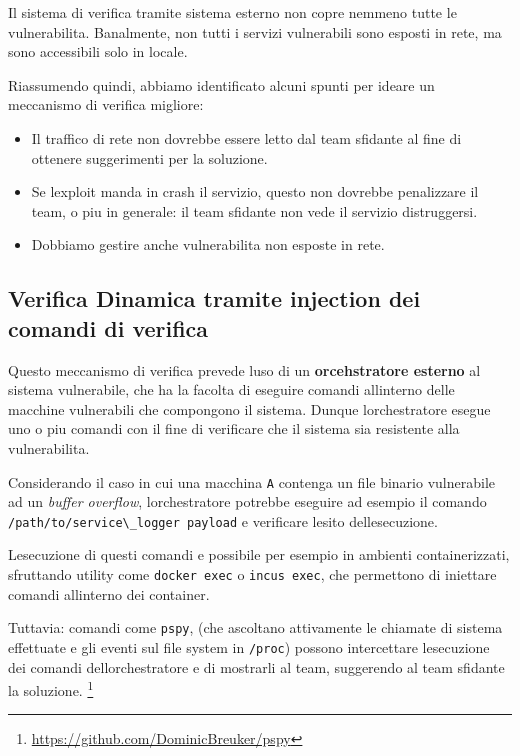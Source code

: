 Il sistema di verifica tramite sistema esterno non copre nemmeno tutte
le vulnerabilita. Banalmente, non tutti i servizi vulnerabili sono
esposti in rete, ma sono accessibili solo in locale.

Riassumendo quindi, abbiamo identificato alcuni spunti per ideare un
meccanismo di verifica migliore:

\begin{itemize}
\tightlist
\item
  Il traffico di rete non dovrebbe essere letto dal team sfidante al
  fine di ottenere suggerimenti per la soluzione.
\item
  Se l\textquotesingle exploit manda in crash il servizio, questo non
  dovrebbe penalizzare il team, o piu in generale: il team sfidante non
  vede il servizio distruggersi.
\item
  Dobbiamo gestire anche vulnerabilita non esposte in rete.
\end{itemize}

\subsection{Verifica Dinamica tramite injection dei comandi di
verifica}\label{verifica-dinamica-tramite-injection-dei-comandi-di-verifica}

Questo meccanismo di verifica prevede l\textquotesingle uso di un
\textbf{orcehstratore esterno} al sistema vulnerabile, che ha la facolta
di eseguire comandi all\textquotesingle interno delle macchine
vulnerabili che compongono il sistema. Dunque
l\textquotesingle orchestratore esegue uno o piu comandi con il fine di
verificare che il sistema sia resistente alla vulnerabilita.

Considerando il caso in cui una macchina \passthrough{\lstinline!A!}
contenga un file binario vulnerabile ad un \emph{buffer overflow},
l\textquotesingle orchestratore potrebbe eseguire ad esempio il comando
\passthrough{\lstinline!/path/to/service\_logger payload!} e verificare
l\textquotesingle esito dell\textquotesingle esecuzione.

L\textquotesingle esecuzione di questi comandi e\textquotesingle{}
possibile per esempio in ambienti containerizzati, sfruttando utility
come \passthrough{\lstinline!docker exec!} o
\passthrough{\lstinline!incus exec!}, che permettono di iniettare
comandi all\textquotesingle interno dei container.

Tuttavia: comandi come \passthrough{\lstinline!pspy!}, (che ascoltano
attivamente le chiamate di sistema effettuate e gli eventi sul file
system in \passthrough{\lstinline!/proc!}) possono intercettare
l\textquotesingle esecuzione dei comandi
dell\textquotesingle orchestratore e di mostrarli al team, suggerendo al
team sfidante la soluzione. \footnote{\label{fn:ref_2}\url{https://github.com/DominicBreuker/pspy}}

